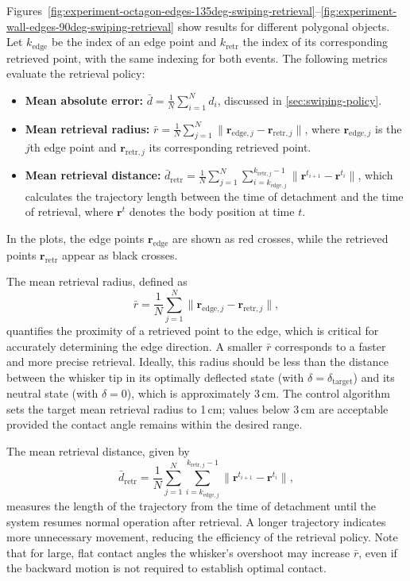 Figures~\ref{fig:experiment-octagon-edges-135deg-swiping-retrieval}--\ref{fig:experiment-wall-edges-90deg-swiping-retrieval} show results for different polygonal objects.
Let $k_{\mathrm{edge}}$ be the index of an edge point and $k_{\mathrm{retr}}$ the index of its corresponding retrieved point, with the same indexing for both events.
The following metrics evaluate the retrieval policy:
\begin{itemize}
    \item \textbf{Mean absolute error:} $\bar{d} = \frac{1}{N}\sum_{i=1}^{N} d_i$, discussed in \cref{sec:swiping-policy}.
    \item \textbf{Mean retrieval radius:} $\bar{r} = \frac{1}{N}\sum_{j=1}^{N} \|\mathbf{r}_{\mathrm{edge},j} - \mathbf{r}_{\mathrm{retr},j}\|$, where $\mathbf{r}_{\mathrm{edge},j}$ is the $j$th edge point and $\mathbf{r}_{\mathrm{retr},j}$ its corresponding retrieved point.
    \item \textbf{Mean retrieval distance:} $\bar{d}_{\mathrm{retr}} = \frac{1}{N}\sum_{j=1}^{N}\sum_{i=k_{\mathrm{edge},j}}^{k_{\mathrm{retr},j}-1} \|\mathbf{r}^{t_{i+1}} - \mathbf{r}^{t_i}\|$, which calculates the trajectory length between the time of detachment and the time of retrieval, where $\mathbf{r}^{t}$ denotes the body position at time $t$.
\end{itemize}
In the plots, the edge points $\mathbf{r}_{\mathrm{edge}}$ are shown as red crosses, while the retrieved points $\mathbf{r}_{\mathrm{retr}}$ appear as black crosses.

The mean retrieval radius, defined as
\[
\bar{r} = \frac{1}{N}\sum_{j=1}^{N} \|\mathbf{r}_{\mathrm{edge},j} - \mathbf{r}_{\mathrm{retr},j}\|,
\]
quantifies the proximity of a retrieved point to the edge, which is critical for accurately determining the edge direction.
A smaller $\bar{r}$ corresponds to a faster and more precise retrieval.
Ideally, this radius should be less than the distance between the whisker tip in its optimally deflected state (with $\delta=\delta_{\mathrm{target}}$) and its neutral state (with $\delta=0$), which is approximately 3\,cm.
The control algorithm sets the target mean retrieval radius to 1\,cm; values below 3\,cm are acceptable provided the contact angle remains within the desired range.

The mean retrieval distance, given by
\[
\bar{d}_{\mathrm{retr}} = \frac{1}{N}\sum_{j=1}^{N}\sum_{i=k_{\mathrm{edge},j}}^{k_{\mathrm{retr},j}-1} \|\mathbf{r}^{t_{i+1}} - \mathbf{r}^{t_i}\|,
\]
measures the length of the trajectory from the time of detachment until the system resumes normal operation after retrieval.
A longer trajectory indicates more unnecessary movement, reducing the efficiency of the retrieval policy.
Note that for large, flat contact angles the whisker's overshoot may increase $\bar{r}$, even if the backward motion is not required to establish optimal contact.

